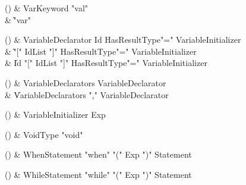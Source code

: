 \begin{bbgrammarappendix}

() & VarKeyword \label{prod:VarKeyword}  \: \xcd"val"  \\

 &    \| \xcd"var" \\

\end{bbgrammarappendix}

\begin{bbgrammarappendix}

() & VariableDeclarator \label{prod:VariableDeclarator}  \: Id HasResultType\opt \xcd"=" VariableInitializer  \\

 &    \| \xcd"[" IdList \xcd"]" HasResultType\opt \xcd"=" VariableInitializer \\
 &    \| Id \xcd"[" IdList \xcd"]" HasResultType\opt \xcd"=" VariableInitializer \\

\end{bbgrammarappendix}

\begin{bbgrammarappendix}

() & VariableDeclarators \label{prod:VariableDeclarators}  \: VariableDeclarator  \\

 &    \| VariableDeclarators \xcd"," VariableDeclarator \\

\end{bbgrammarappendix}

\begin{bbgrammarappendix}

() & VariableInitializer \label{prod:VariableInitializer}  \: Exp  \\


\end{bbgrammarappendix}

\begin{bbgrammarappendix}

() & VoidType \label{prod:VoidType}  \: \xcd"void"  \\


\end{bbgrammarappendix}

\begin{bbgrammarappendix}

() & WhenStatement \label{prod:WhenStatement}  \: \xcd"when" \xcd"(" Exp \xcd")" Statement  \\


\end{bbgrammarappendix}

\begin{bbgrammarappendix}

() & WhileStatement \label{prod:WhileStatement}  \: \xcd"while" \xcd"(" Exp \xcd")" Statement  \\


\end{bbgrammarappendix}
